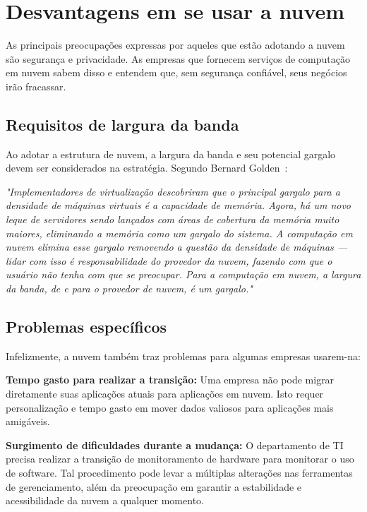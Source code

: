 \section{Desvantagens em se usar a nuvem}

As principais preocupações expressas por aqueles que estão adotando a nuvem são
segurança e privacidade. As empresas que fornecem serviços de computação em nuvem
sabem disso e entendem que, sem segurança confiável, seus negócios irão
fracassar.

\subsection{Requisitos de largura da banda}

Ao adotar a estrutura de nuvem, a largura da banda e seu potencial gargalo devem ser 
considerados na estratégia. Segundo Bernard 
Golden~\cite{cio-cloud-computing-bottleneck}:

\begin{displayquote}
\emph{
    "Implementadores de virtualização descobriram que o principal gargalo para a 
    densidade de máquinas virtuais é a capacidade de memória. Agora, há um novo
    leque de servidores sendo lançados com áreas de cobertura da memória muito
    maiores, eliminando a memória como um gargalo do sistema. A computação em nuvem
    elimina esse gargalo removendo a questão da densidade de máquinas --- lidar com
    isso é responsabilidade do provedor da nuvem, fazendo com que o usuário não tenha
    com que se preocupar.
    Para a computação em nuvem, a largura da banda, de e para o provedor de nuvem,
    é um gargalo."
}
\end{displayquote}

\subsection{Problemas específicos}

Infelizmente, a nuvem também traz problemas para algumas empresas usarem-na:

\newcommand{\itemm}[1]{\item\textbf{#1}}

\begin{itemise}

    \itemm{Tempo gasto para realizar a transição:} Uma empresa não pode migrar
    diretamente suas aplicações atuais para aplicações em nuvem. Isto requer
    personalização e tempo gasto em mover dados valiosos para aplicações mais
    amigáveis.

    \itemm{Surgimento de dificuldades durante a mudança:} O departamento de TI
    precisa realizar a transição de monitoramento de hardware para monitorar o uso
    de software. Tal procedimento pode levar a múltiplas alterações nas ferramentas de
    gerenciamento, além da preocupação em garantir a estabilidade e acessibilidade
    da nuvem a qualquer momento.

\end{itemise}

\undef\itemm

